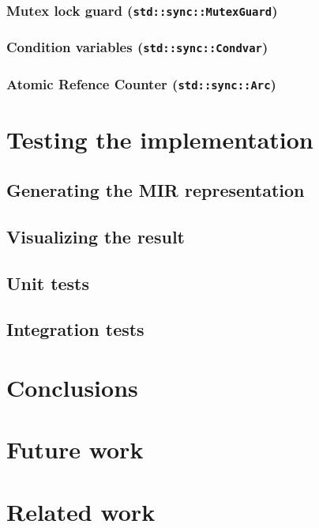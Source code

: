 \documentclass[12pt, oneside]{book}
\begin{document}
\subsection{Mutex lock guard (\texttt{std::sync::MutexGuard})}
\subsection{Condition variables (\texttt{std::sync::Condvar})}
\subsection{Atomic Refence Counter (\texttt{std::sync::Arc})}

\chapter{Testing the implementation}

\section{Generating the MIR representation}
\section{Visualizing the result}
\section{Unit tests}
\section{Integration tests}

\cite{dot2015}
\cite{hillah:hal-01176335}
\cite{jungel2000petri}

\chapter{Conclusions}

\chapter{Future work}

\chapter{Related work}


\clearpage


\end{document}
